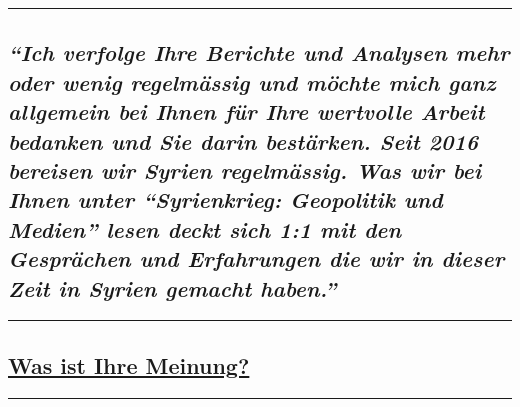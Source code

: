 \begin{center}\rule{0.5\linewidth}{\linethickness}\end{center}

\hypertarget{ich-verfolge-ihre-berichte-und-analysen-mehr-oder-wenig-regelmuxe4ssig-und-muxf6chte-mich-ganz-allgemein-bei-ihnen-fuxfcr-ihre-wertvolle-arbeit-bedanken-und-sie-darin-bestuxe4rken-seit-2016-bereisen-wir-syrien-regelmuxe4ssig-was-wir-bei-ihnen-unter-syrienkrieg-geopolitik-und-medien-lesen-deckt-sich-11-mit-den-gespruxe4chen-und-erfahrungen-die-wir-in-dieser-zeit-in-syrien-gemacht-haben}{%
\subsection{\texorpdfstring{\emph{``Ich verfolge Ihre Berichte und
Analysen mehr oder wenig regelmässig und möchte mich ganz allgemein bei
Ihnen für Ihre wertvolle Arbeit bedanken und Sie darin bestärken. Seit
2016 bereisen wir Syrien regelmässig. Was wir bei Ihnen unter
``Syrienkrieg: Geopolitik und Medien'' lesen deckt sich 1:1 mit den
Gesprächen und Erfahrungen die wir in dieser Zeit in Syrien gemacht
haben.''}}{``Ich verfolge Ihre Berichte und Analysen mehr oder wenig regelmässig und möchte mich ganz allgemein bei Ihnen für Ihre wertvolle Arbeit bedanken und Sie darin bestärken. Seit 2016 bereisen wir Syrien regelmässig. Was wir bei Ihnen unter ``Syrienkrieg: Geopolitik und Medien'' lesen deckt sich 1:1 mit den Gesprächen und Erfahrungen die wir in dieser Zeit in Syrien gemacht haben.''}}\label{ich-verfolge-ihre-berichte-und-analysen-mehr-oder-wenig-regelmuxe4ssig-und-muxf6chte-mich-ganz-allgemein-bei-ihnen-fuxfcr-ihre-wertvolle-arbeit-bedanken-und-sie-darin-bestuxe4rken-seit-2016-bereisen-wir-syrien-regelmuxe4ssig-was-wir-bei-ihnen-unter-syrienkrieg-geopolitik-und-medien-lesen-deckt-sich-11-mit-den-gespruxe4chen-und-erfahrungen-die-wir-in-dieser-zeit-in-syrien-gemacht-haben}}

\begin{center}\rule{0.5\linewidth}{\linethickness}\end{center}

\hypertarget{was-ist-ihre-meinung-1}{%
\subsection{\texorpdfstring{\href{https://swprs.org/kontakt/}{Was ist
Ihre Meinung?}}{Was ist Ihre Meinung?}}\label{was-ist-ihre-meinung-1}}

\begin{center}\rule{0.5\linewidth}{\linethickness}\end{center}

